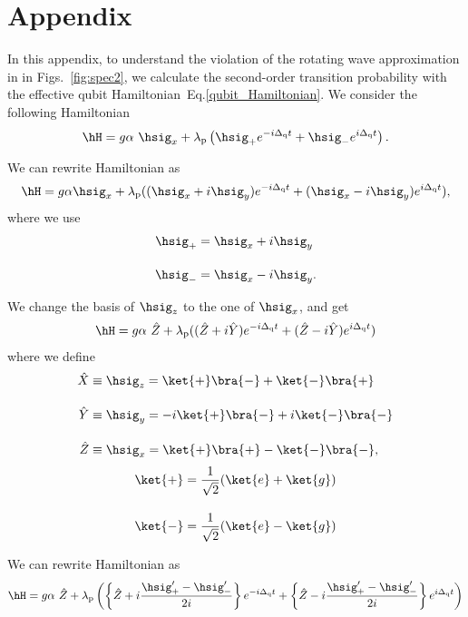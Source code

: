 
\section{Appendix}
In this appendix, to understand the violation of the rotating wave approximation in in Figs.~\ref{fig:spec2}, we calculate the second-order transition probability with the effective qubit Hamiltonian~Eq.\eqref{qubit_Hamiltonian}.
We consider the following Hamiltonian
\begin{equation}
    \hH=g\alpha\ \hsig_x+\lambda_{\rm{p}}\left(\hsig_+ e^{-i\Delta _{\rm{q}}t}+\hsig_- e^{i\Delta _{\rm{q}}t}\right).
\end{equation}

We can rewrite Hamiltonian as
\begin{align}
    \hH=g\alpha\hsig_x + \lambda_{\rm{p}} ((\hsig_x+i\hsig_y)e^{-i\Delta _{\rm{q}} t} + (\hsig_x-i\hsig_y)e^{i\Delta _{\rm{q}} t}),
\end{align}
where we use
\begin{align}
    \hsig_+&=\hsig_x+i\hsig_y\\[10pt]
    \hsig_-&=\hsig_x-i\hsig_y.
\end{align}

We change the basis of $\hsig_z$ to the one of $\hsig_x$, and get
\begin{align}
    \hH=g\alpha\ \hat{Z} + \lambda_{\rm{p}} ((\hat{Z}+i\hat{Y})e^{-i\Delta _{\rm{q}} t} + (\hat{Z}-i\hat{Y})e^{i\Delta _{\rm{q}} t})
\end{align}
where we define
\begin{align}
    \hat{X} &\equiv \hsig_z 
    = \ket{+}\bra{-} + \ket{-}\bra{+}\\[10pt]
    \hat{Y} &\equiv \hsig_y 
    = -i\ket{+}\bra{-} +i \ket{-}\bra{-}\\[10pt]
    \hat{Z} &\equiv \hsig_x 
    = \ket{+}\bra{+} - \ket{-}\bra{-},
\end{align}
\begin{align}
    \ket{+} &
    = \frac{1}{\sqrt{2}}
    (\ket{e} + \ket{g})\\[10pt]
    \ket{-} &
    = \frac{1}{\sqrt{2}}
    (\ket{e} - \ket{g})
\end{align}

We can rewrite Hamiltonian as
\begin{align}
    \hH=g\alpha\ \hat{Z} + \lambda_{\rm{p}} \left(\left\{\hat{Z}+i\frac{\hsig_+^\prime-\hsig_-^\prime}{2i}\right\}e^{-i\Delta _{\rm{q}} t} + \left\{\hat{Z}-i\frac{\hsig_+^\prime-\hsig_-^\prime}{2i}\right\}e^{i\Delta _{\rm{q}} t}\right)
\end{align}

